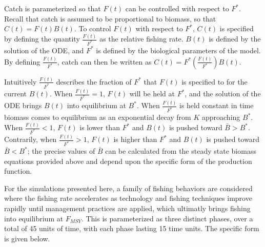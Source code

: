 \documentclass[12pt]{article}
\begin{document}
%
Catch is parameterized so that $F(t)$ can be controlled with respect to $F^*$. 
Recall that catch is assumed to be proportional to biomass, so that $C(t)=F(t)B(t)$.
To control $F(t)$ with respect to $F^*$, $C(t)$ is specified by defining the 
quantity $\frac{F(t)}{F^*}$ as the relative fishing rate. $B(t)$ is defined 
by the solution of the ODE, and $F^*$ is defined by the biological parameters 
of the model. By defining $\frac{F(t)}{F^*}$, catch can then be written as 
\mbox{$C(t)=F^*\left(\frac{F(t)}{F^*}\right)B(t)$.}

%
Intuitively $\frac{F(t)}{F^*}$ describes the fraction of $F^*$ that $F(t)$ is  
specified to for the current $B(t)$. When $\frac{F(t)}{F^*}=1$, $F(t)$ will be 
held at $F^*$, and the solution of the ODE brings $B(t)$ into equilibrium at 
$B^*$. When $\frac{F(t)}{F^*}$ is held constant in time biomass %
comes to equilibrium as an exponential decay from $K$ approaching $B^*$. 
When $\frac{F(t)}{F^*}<1$, $F(t)$ is lower than $F^*$ and $B(t)$ is pushed 
toward $\bar B>B^*$. Contrarily, when $\frac{F(t)}{F^*}>1$, $F(t)$ is higher 
than $F^*$ and $B(t)$ is pushed toward $\bar B<B^*$; the precise values of 
$\bar B$ can be calculated from the steady state biomass equations provided 
above and depend upon the specific form of the production function. %

%
For the simulations presented here, a family of fishing behaviors are 
considered where the fishing rate accelerates as technology and fishing 
techniques improve rapidly until management practices are applied, which 
ultimatly brings fishing into equilibrium at $F_{MSY}$. %
This is parameterized as three distinct phases, over a total of 45 units of 
time, with each phase lasting 15 time units. The specific form is given below. %
\end{document}
